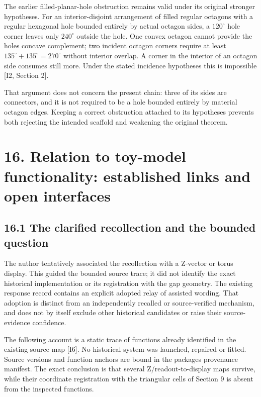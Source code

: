 \documentclass[
  11pt,
  a4paper,
]{article}
\begin{document}
The earlier filled-planar-hole obstruction remains valid under its original stronger hypotheses. For an interior-disjoint arrangement of filled regular octagons with a regular hexagonal hole bounded entirely by actual octagon sides, a \(120^\circ\) hole corner leaves only \(240^\circ\) outside the hole. One convex octagon cannot provide the hole\textquotesingle s concave complement; two incident octagon corners require at least \(135^\circ+135^\circ=270^\circ\) without interior overlap. A corner in the interior of an octagon side consumes still more. Under the stated incidence hypotheses this is impossible {[}I2, Section 2{]}.

That argument does not concern the present chain: three of its sides are connectors, and it is not required to be a hole bounded entirely by material octagon edges. Keeping a correct obstruction attached to its hypotheses prevents both rejecting the intended scaffold and weakening the original theorem.

\section{16. Relation to toy-model functionality: established links and open interfaces}\label{relation-to-toy-model-functionality-established-links-and-open-interfaces}

\subsection{16.1 The clarified recollection and the bounded question}\label{the-clarified-recollection-and-the-bounded-question}

The author tentatively associated the recollection with a Z-vector or torus display. This guided the bounded source trace; it did not identify the exact historical implementation or its registration with the gap geometry. The existing response record contains an explicit adopted relay of assisted wording. That adoption is distinct from an independently recalled or source-verified mechanism, and does not by itself exclude other historical candidates or raise their source-evidence confidence.

The following account is a static trace of functions already identified in the existing source map {[}I6{]}. No historical system was launched, repaired or fitted. Source versions and function anchors are bound in the package\textquotesingle s provenance manifest. The exact conclusion is that several Z/readout-to-display maps survive, while their coordinate registration with the triangular cells of Section 9 is absent from the inspected functions.
\end{document}
